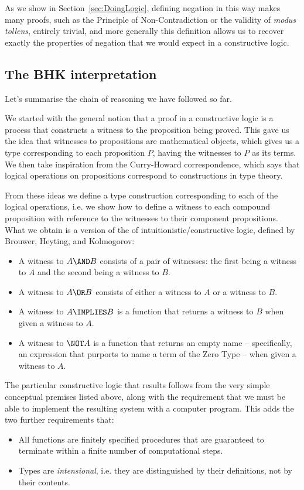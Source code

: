 As we show in Section~\ref{sec:DoingLogic}, 
defining negation in this way makes many proofs, 
such as the Principle of Non-Contradiction or the validity of \emph{modus tollens}, entirely trivial, and more generally this definition allows us to recover exactly the properties of negation that we would expect in a constructive logic.

\subsection{The BHK interpretation}
\label{sec:Logic-BHK}

Let's summarise the chain of reasoning we have followed so far.

We started with the general notion that a proof in a constructive logic is a process that constructs a witness to the proposition being proved. This gave us the idea that witnesses to propositions are mathematical objects, which gives us a type corresponding to each proposition $P$, having the witnesses to $P$ as its terms.  
We then take inspiration from the Curry-Howard correspondence, which says that logical operations on propositions correspond to constructions in type theory.  

From these ideas we define a type construction corresponding to each of the logical operations, i.e. we show how to define a witness to each compound proposition with reference to the witnesses to their component propositions. What we obtain is a version of the  of intuitionistic/constructive logic, defined by Brouwer, Heyting, and Kolmogorov:
\begin{samepage}
\begin{itemize}
\item A witness to $A \AND B$ consists of a pair of witnesses: the first being a witness to $A$ and the second being a witness to $B$.
\item A witness to $A \OR B$ consists of either a witness to $A$ or a witness to $B$.
\item A witness to $A \IMPLIES B$ is a function that returns a witness to $B$ when given a witness to $A$.
\item A witness to $\NOT A$ is a function that returns an empty name -- specifically, an expression that purports to name a term of the Zero Type -- when given a witness to $A$.
\end{itemize}
\end{samepage}
The particular constructive logic that results follows from the very simple conceptual premises listed above, along with the requirement that we must be able to implement the resulting system with a computer program. This adds the two further requirements that:
\begin{itemize}
\item All functions are finitely specified procedures that are guaranteed to terminate within a finite number of computational steps.
\item Types are \emph{intensional}, i.e. they are distinguished by their definitions, not by their contents.
\end{itemize}

